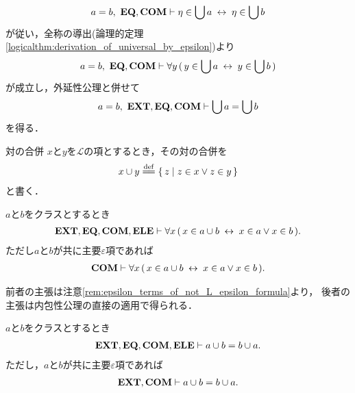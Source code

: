 \begin{sketch}
		\begin{align}
			a = b,\ \mbox{{\bf EQ}},\mbox{\bf COM} \vdash 
			\eta \in \bigcup a \hspace{0.25em}\leftrightarrow\hspace{0.25em} \eta \in \bigcup b
		\end{align}
		が従い，全称の導出(論理的定理\ref{logicalthm:derivation_of_universal_by_epsilon})より
		\begin{align}
			a = b,\ \mbox{{\bf EQ}},\mbox{\bf COM} \vdash 
			\forall y\, (\, y \in \bigcup a \hspace{0.25em}\leftrightarrow\hspace{0.25em} y \in \bigcup b\, )
		\end{align}
		が成立し，外延性公理と併せて
		\begin{align}
			a = b,\ \mbox{{\bf EXT}},\mbox{{\bf EQ}},\mbox{\bf COM} \vdash 
			\bigcup a = \bigcup b
		\end{align}
		を得る．
		\QED
	\end{sketch}
	
	\begin{itembox}[l]{対の合併}
		$x$と$y$を$\mathcal{L}$の項とするとき，その対の合併を
		\begin{align}
			x \cup y \defeq \Set{z}{z \in x \vee z \in y}
		\end{align}
		と書く．
	\end{itembox}
	
	\begin{screen}
		\begin{thm}[二つのクラスの合併はそれぞれの要素を合わせたもの]
		\label{thm:elements_of_pair_union}
			$a$と$b$をクラスとするとき
			\begin{align}
				\mbox{{\bf EXT}},\mbox{{\bf EQ}},\mbox{\bf COM},\mbox{{\bf ELE}} \vdash \forall x\, (\, x \in a \cup b \hspace{0.25em}\leftrightarrow\hspace{0.25em} x \in a \vee x \in b\, ).
			\end{align}
			ただし$a$と$b$が共に主要$\varepsilon$項であれば
			\begin{align}
				\mbox{\bf COM} \vdash \forall x\, (\, x \in a \cup b \hspace{0.25em}\leftrightarrow\hspace{0.25em} x \in a \vee x \in b\, ).
			\end{align}
		\end{thm}
	\end{screen}
	
	\begin{sketch}
		前者の主張は注意\ref{rem:epsilon_terms_of_not_L_epsilon_formula}より，
		後者の主張は内包性公理の直接の適用で得られる．
		\QED
	\end{sketch}
	
	\begin{screen}
		\begin{thm}[対の合併の対称性]
		\label{thm:symmetry_of_union_of_a_pair}
			$a$と$b$をクラスとするとき
			\begin{align}
				\mbox{{\bf EXT}},\mbox{{\bf EQ}},\mbox{\bf COM},\mbox{{\bf ELE}} \vdash a \cup b = b \cup a.
			\end{align}
			ただし，$a$と$b$が共に主要$\varepsilon$項であれば
			\begin{align}
				\mbox{{\bf EXT}},\mbox{\bf COM} \vdash a \cup b = b \cup a.
			\end{align}
		\end{thm}
	\end{screen}
	
